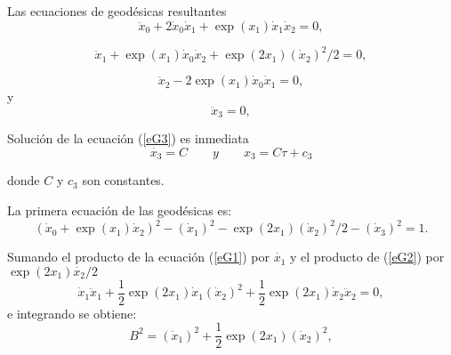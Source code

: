 \documentclass[11pt]{book}
\begin{document}

Las ecuaciones de geodésicas resultantes %
\begin{equation}
\ddot x_0 + 2 \dot x_0 \dot x_1 + \exp(x_1) \dot x_1 \dot x_2 = 0,
\label{eG0}
\end{equation}

\begin{equation}
\ddot x_1 + \exp(x_1) \dot x_0 \dot x_2 + \exp(2 x_1 ) (\dot x_2)^2/2 = 0,
\label{eG1}
\end{equation}

\begin{equation}
\ddot x_2 - 2 \exp(x_1) \dot x_0 \dot x_1 = 0,
\label{eG2}
\end{equation}
%
y
%
\begin{equation}
\ddot x_3 = 0,
\label{eG3}
\end{equation}
%


Solución de la ecuación (\ref{eG3}) es inmediata
\begin{equation}
\dot{x_3}=C \qquad y \qquad x_3=C\tau + c_3
\label{g3}
\end{equation}

donde $C$ y $c_3$ son constantes. %

La primera ecuación de las geodésicas es:
\begin{equation}
\left( \dot x_0 + \exp (x_1) \dot x_2 \right)^2 - (\dot x_1)^2 - \exp (2 x_1) (\dot x_2)^2 / 2 - (\dot x_3)^2 = 1.
\label{int1}
\end{equation}

Sumando el producto de la ecuación (\ref{eG1}) por $\dot{x_1}$ y el producto de (\ref{eG2}) por $\exp(2x_1)\dot{x_2}/2$
\begin{equation}
\dot x_1 \ddot x_1 + \frac {1}{2} \exp (2 x_1) \dot x_1 (\dot x_2)^2 + \frac {1}{2} \exp (2 x_1) \dot x_2 \ddot x_2 = 0,
\label{inter1}
\end{equation}
e integrando se obtiene:
\begin{equation}
B^2=(\dot x_1)^2 + \frac{1}{2} \exp (2 x_1) (\dot x_2)^2,
\label{inter2}
\end{equation}
\end{document}
